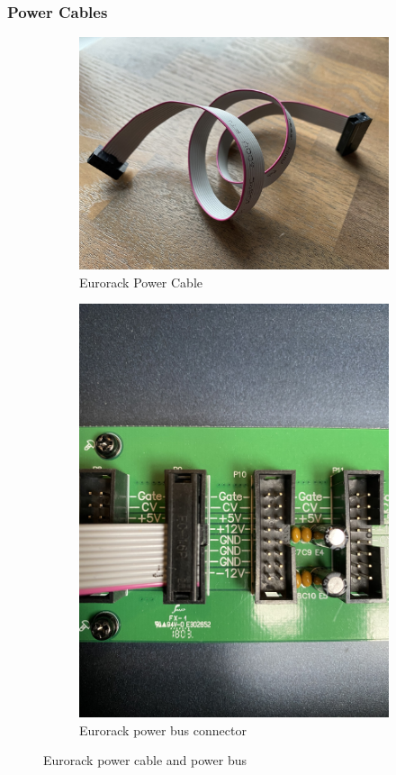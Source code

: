 \documentclass{article}
\begin{document}
\subsubsection{Power Cables}
\begin{figure}[h]
\centering
\begin{subfigure}{.5\textwidth}
	\centering
	\includegraphics[width=1\linewidth]{../Images/Fig_Power_Cable_1}
	\caption{Eurorack Power Cable}
	\label{fig:power-cable}
\end{subfigure}%
\begin{subfigure}{.5\textwidth}
	\centering
	\includegraphics[width=0.8\linewidth]{../Images/Fig_Power_Bus}
	\caption{Eurorack power bus connector}
	\label{fig:power-bus}
\end{subfigure}
\caption{Eurorack power cable and power bus}
\end{figure}
\end{document}
